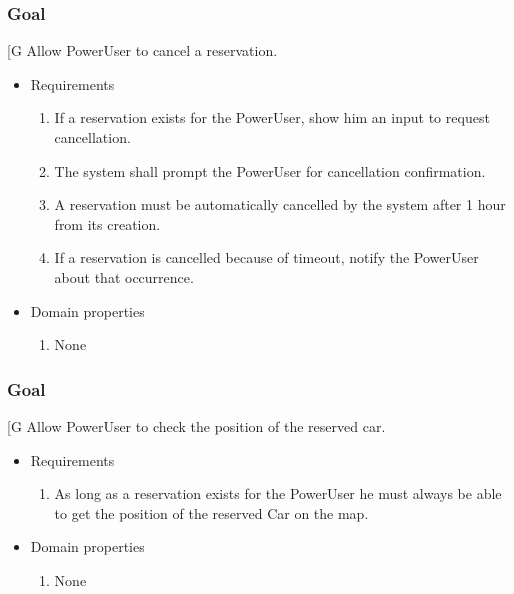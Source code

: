     \subsubsection{Goal }
    {[}G\arabic{goalctr}{]}
    Allow PowerUser to cancel a reservation.
    \begin{itemize}
        \item Requirements
        \begin{enumerate}[REQ]
    			\item If a reservation exists for the PowerUser, show him an input to request cancellation.
    			\item The system shall prompt the PowerUser for cancellation confirmation.
    			\item A reservation must be automatically cancelled by the system after 1 hour from its creation.
    			\item If a reservation is cancelled because of timeout, notify the PowerUser about that occurrence.
        \end{enumerate}
        \item Domain properties
        \begin{enumerate}[PRO]
    			\item None
        \end{enumerate}
    \end{itemize}

    \subsubsection{Goal }
    {[}G\arabic{goalctr}{]}
	Allow PowerUser to check the position of the reserved car.
    \begin{itemize}
        \item Requirements
        \begin{enumerate}[REQ]
    	        \item As long as a reservation exists for the PowerUser he must always be able to get the position of the reserved Car on the map.
        \end{enumerate}
        \item Domain properties
        \begin{enumerate}[PRO]
    		    \item None
        \end{enumerate}
    \end{itemize}

